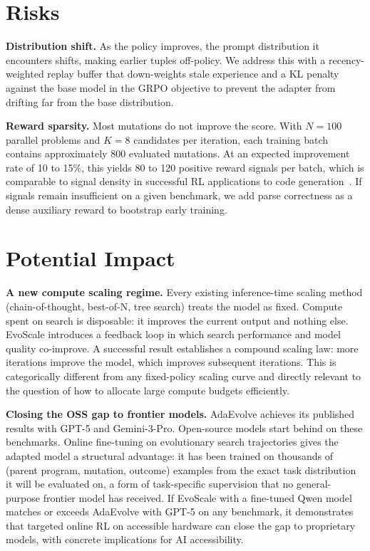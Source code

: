 \documentclass{article}
\begin{document}
\section*{Risks}

\textbf{Distribution shift.} As the policy improves, the prompt
distribution it encounters shifts, making earlier tuples off-policy.
We address this with a recency-weighted replay buffer that down-weights
stale experience and a KL penalty against the base model in the GRPO
objective to prevent the adapter from drifting far from the base
distribution.

\textbf{Reward sparsity.} Most mutations do not improve the score. With
$N = 100$ parallel problems and $K = 8$ candidates per iteration, each
training batch contains approximately 800 evaluated mutations. At an
expected improvement rate of 10 to 15\%, this yields 80 to 120 positive
reward signals per batch, which is comparable to signal density in
successful RL applications to code generation~\cite{deepseekr1}. If
signals remain insufficient on a given benchmark, we add parse correctness
as a dense auxiliary reward to bootstrap early training.

\section*{Potential Impact}

\textbf{A new compute scaling regime.} Every existing inference-time
scaling method (chain-of-thought, best-of-N, tree search) treats the
model as fixed. Compute spent on search is disposable: it improves the
current output and nothing else. EvoScale introduces a feedback loop
in which search performance and model quality co-improve. A successful
result establishes a compound scaling law: more iterations improve the
model, which improves subsequent iterations. This is categorically
different from any fixed-policy scaling curve and directly relevant
to the question of how to allocate large compute budgets efficiently.

\textbf{Closing the OSS gap to frontier models.} AdaEvolve achieves its
published results with GPT-5 and Gemini-3-Pro. Open-source models start
behind on these benchmarks. Online fine-tuning on evolutionary search
trajectories gives the adapted model a structural advantage: it has been
trained on thousands of (parent program, mutation, outcome) examples
from the exact task distribution it will be evaluated on, a form of
task-specific supervision that no general-purpose frontier model has
received. If EvoScale with a fine-tuned Qwen model matches or exceeds
AdaEvolve with GPT-5 on any benchmark, it demonstrates that targeted
online RL on accessible hardware can close the gap to proprietary models,
with concrete implications for AI accessibility.
\end{document}
